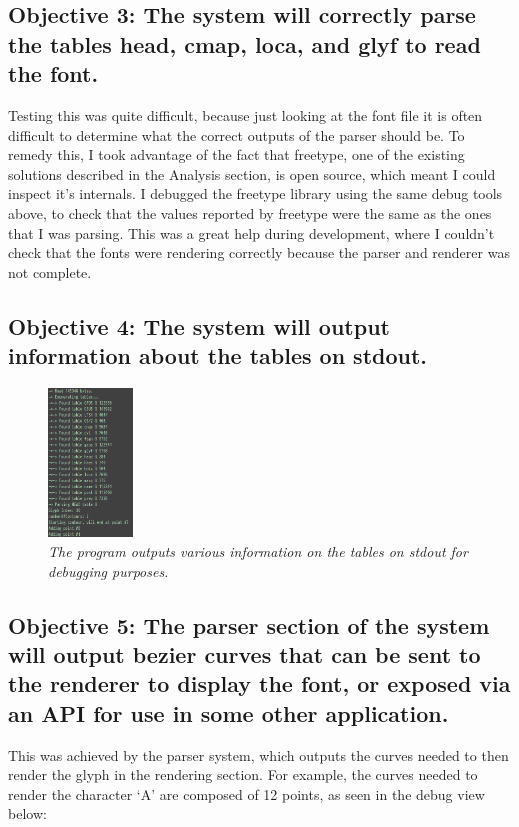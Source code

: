 \documentclass{report}
\begin{document}
\subsection{Objective 3: The system will correctly parse the tables head, cmap, loca, and glyf to read the font.}

Testing this was quite difficult, because just looking at the font file it is often
difficult to determine what the correct outputs of the parser should be. To
remedy this, I took advantage of the fact that freetype, one of the existing
solutions described in the Analysis section, is open source, which meant I could
inspect it's internals. I debugged the freetype library using the same debug
tools above, to check that the values reported by freetype were the same as the
ones that I was parsing. This was a great help during development, where I
couldn't check that the fonts were rendering correctly because the parser and
renderer was not complete.

\subsection{Objective 4: The system will output information about the tables on stdout.}

\begin{figure}[h]
  \centering
  \includegraphics[width=0.2\textwidth]{tables2}
  \caption{\textit{The program outputs various information on the tables on
      stdout for debugging purposes.}}
\end{figure}

\subsection{Objective 5: The parser section of the system will output bezier
  curves that can be sent to the renderer to display the font, or exposed via an
  API for use in some other application.}

This was achieved by the parser system, which outputs the curves needed to then
render the glyph in the rendering section. For example, the curves needed to
render the character `A' are composed of 12 points, as seen in the debug view
below:
\end{document}
